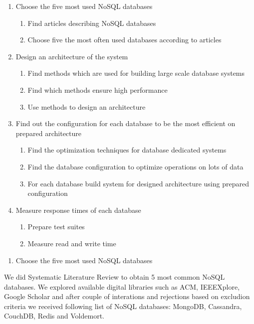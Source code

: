 \documentclass[times, 10pt,twocolumn]{article}
\begin{document}
\begin{enumerate}
  \item Choose the five most used NoSQL databases
	\begin{enumerate}
	  \item Find articles describing NoSQL databases
	  \item Choose five the most often used databases according to articles 
	\end{enumerate}
  \item Design an architecture of the system
	\begin{enumerate}
	  \item Find methods which are used for building large scale database systems
	  \item Find which methods ensure high performance
	  \item Use methods to design an architecture
	\end{enumerate}
  \item Find out the configuration for each database to be the most efficient on prepared architecture
    \begin{enumerate}
	  \item Find the optimization techniques for database dedicated systems
	  \item Find the database configuration to optimize operations on lots of data
	  \item For each database build system for designed architecture using prepared configuration
	\end{enumerate}
  \item Measure response times of each database
    \begin{enumerate}
      \item Prepare test suites
      \item Measure read and write time   
    \end{enumerate}  
\end{enumerate}


	\begin{enumerate}
	  \item Choose the five most used NoSQL databases
	\end{enumerate}
	
	We did Systematic Literature Review \cite{slr} to obtain 5 most common
	NoSQL databases. We explored available digital libraries such as ACM, IEEEXplore,
	Google Scholar and after couple of interations and rejections based on
	excludion criteria we received following list of NoSQL databases: MongoDB, Cassandra, CouchDB, Redis and Voldemort.  
\end{document}
